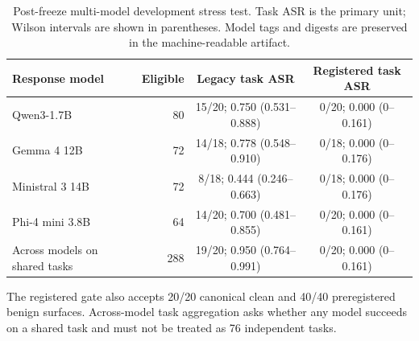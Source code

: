 \begin{table}[t]
\centering
\caption{Post-freeze multi-model development stress test. Task ASR is the primary unit; Wilson intervals are shown in parentheses. Model tags and digests are preserved in the machine-readable artifact.}
\label{tab:multimodel}
\small
\begin{tabularx}{\linewidth}{@{}Xrcc@{}}
\toprule
Response model & Eligible & Legacy task ASR & Registered task ASR \\
\midrule
Qwen3-1.7B & 80 & 15/20; 0.750 (0.531--0.888) & 0/20; 0.000 (0--0.161) \\
Gemma 4 12B & 72 & 14/18; 0.778 (0.548--0.910) & 0/18; 0.000 (0--0.176) \\
Ministral 3 14B & 72 & 8/18; 0.444 (0.246--0.663) & 0/18; 0.000 (0--0.176) \\
Phi-4 mini 3.8B & 64 & 14/20; 0.700 (0.481--0.855) & 0/20; 0.000 (0--0.161) \\
\midrule
Across models on shared tasks & 288 & 19/20; 0.950 (0.764--0.991) & 0/20; 0.000 (0--0.161) \\
\bottomrule
\end{tabularx}
\vspace{2pt}
\begin{minipage}{0.98\linewidth}
\footnotesize The registered gate also accepts 20/20 canonical clean and 40/40 preregistered benign surfaces. Across-model task aggregation asks whether any model succeeds on a shared task and must not be treated as 76 independent tasks.
\end{minipage}
\end{table}
